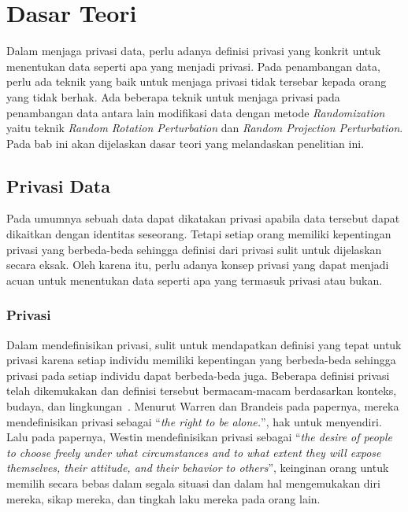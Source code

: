 \chapter{Dasar Teori}
\label{chap:teori}

Dalam menjaga privasi data, perlu adanya definisi privasi yang konkrit untuk menentukan data seperti apa yang menjadi privasi. Pada penambangan data, perlu ada teknik yang baik untuk menjaga privasi tidak tersebar kepada orang yang tidak berhak. Ada beberapa teknik untuk menjaga privasi pada penambangan data antara lain modifikasi data dengan metode \textit{Randomization} yaitu teknik \textit{Random Rotation Perturbation} dan \textit{Random Projection Perturbation}. Pada bab ini akan dijelaskan dasar teori yang melandaskan penelitian ini.

\section{Privasi Data}
\label{sec:privasidata} 

Pada umumnya sebuah data dapat dikatakan privasi apabila data tersebut dapat dikaitkan dengan identitas seseorang. Tetapi setiap orang memiliki kepentingan privasi yang berbeda-beda sehingga definisi dari privasi sulit untuk dijelaskan secara eksak. Oleh karena itu, perlu adanya konsep privasi yang dapat menjadi acuan untuk menentukan data seperti apa yang termasuk privasi atau bukan.

\subsection{Privasi}
\label{subsec:privasi}

Dalam mendefinisikan privasi, sulit untuk mendapatkan definisi yang tepat untuk privasi karena setiap individu memiliki kepentingan yang berbeda-beda sehingga privasi pada setiap individu dapat berbeda-beda juga. Beberapa definisi privasi telah dikemukakan dan definisi tersebut bermacam-macam berdasarkan konteks, budaya, dan lingkungan~\cite{stanleyosmar:04:standardppdm}. Menurut Warren dan Brandeis pada papernya, mereka mendefinisikan privasi sebagai “\textit{the right to be alone.}”, hak untuk menyendiri. Lalu pada papernya, Westin mendefinisikan privasi sebagai “\textit{the desire of people to choose freely under what circumstances and to what extent they will expose themselves, their attitude, and their behavior to others}”, keinginan orang untuk memilih secara bebas dalam segala situasi dan dalam hal mengemukakan diri mereka, sikap mereka, dan tingkah laku mereka pada orang lain. 

